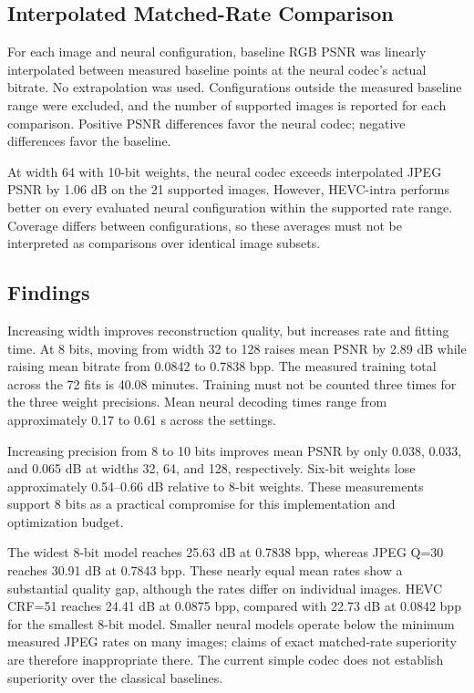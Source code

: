\documentclass[11pt]{article}
\begin{document}
\subsection{Interpolated Matched-Rate Comparison}

For each image and neural configuration, baseline RGB
PSNR was linearly interpolated between measured baseline
points at the neural codec's actual bitrate.
No extrapolation was used. Configurations outside the
measured baseline range were excluded, and the number
of supported images is reported for each comparison.
Positive PSNR differences favor the neural codec;
negative differences favor the baseline.


At width 64 with 10-bit weights, the neural codec
exceeds interpolated JPEG PSNR by 1.06 dB on the
21 supported images. However, HEVC-intra performs
better on every evaluated neural configuration
within the supported rate range. Coverage differs
between configurations, so these averages must
not be interpreted as comparisons over identical
image subsets.
\subsection{Findings}
Increasing width improves reconstruction quality, but increases rate and fitting time. At 8 bits, moving from width 32 to 128 raises mean PSNR by 2.89 dB while raising mean bitrate from 0.0842 to 0.7838 bpp. The measured training total across the 72 fits is 40.08 minutes. Training must not be counted three times for the three weight precisions. Mean neural decoding times range from approximately 0.17 to 0.61 s across the settings.

Increasing precision from 8 to 10 bits improves mean PSNR by only 0.038, 0.033, and 0.065 dB at widths 32, 64, and 128, respectively. Six-bit weights lose approximately 0.54--0.66 dB relative to 8-bit weights. These measurements support 8 bits as a practical compromise for this implementation and optimization budget.

The widest 8-bit model reaches 25.63 dB at 0.7838 bpp, whereas JPEG Q=30 reaches 30.91 dB at 0.7843 bpp. These nearly equal mean rates show a substantial quality gap, although the rates differ on individual images. HEVC CRF=51 reaches 24.41 dB at 0.0875 bpp, compared with 22.73 dB at 0.0842 bpp for the smallest 8-bit model. Smaller neural models operate below the minimum measured JPEG rates on many images; claims of exact matched-rate superiority are therefore inappropriate there. The current simple codec does not establish superiority over the classical baselines.
\end{document}
